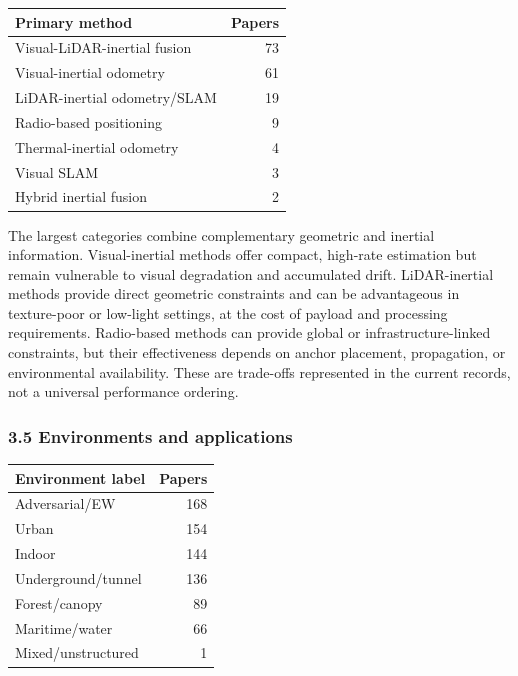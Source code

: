 \documentclass[
  journal]{IEEEtran}
\newcounter{none} %
\begin{document}
{\def\LTcaptype{none} %
\begin{longtable}[]{@{}lr@{}}
\toprule\noalign{}
Primary method & Papers \\
\midrule\noalign{}
\endhead
\bottomrule\noalign{}
\endlastfoot
Visual-LiDAR-inertial fusion & 73 \\
Visual-inertial odometry & 61 \\
LiDAR-inertial odometry/SLAM & 19 \\
Radio-based positioning & 9 \\
Thermal-inertial odometry & 4 \\
Visual SLAM & 3 \\
Hybrid inertial fusion & 2 \\
\end{longtable}
}

The largest categories combine complementary geometric and inertial
information. Visual-inertial methods offer compact, high-rate estimation
but remain vulnerable to visual degradation and accumulated drift.
LiDAR-inertial methods provide direct geometric constraints and can be
advantageous in texture-poor or low-light settings, at the cost of
payload and processing requirements. Radio-based methods can provide
global or infrastructure-linked constraints, but their effectiveness
depends on anchor placement, propagation, or environmental availability.
These are trade-offs represented in the current records, not a universal
performance ordering.

\subsubsection{3.5 Environments and
applications}\label{35-environments-and-applications}

{\def\LTcaptype{none} %
\begin{longtable}[]{@{}lr@{}}
\toprule\noalign{}
Environment label & Papers \\
\midrule\noalign{}
\endhead
\bottomrule\noalign{}
\endlastfoot
Adversarial/EW & 168 \\
Urban & 154 \\
Indoor & 144 \\
Underground/tunnel & 136 \\
Forest/canopy & 89 \\
Maritime/water & 66 \\
Mixed/unstructured & 1 \\
\end{longtable}
}
\end{document}
